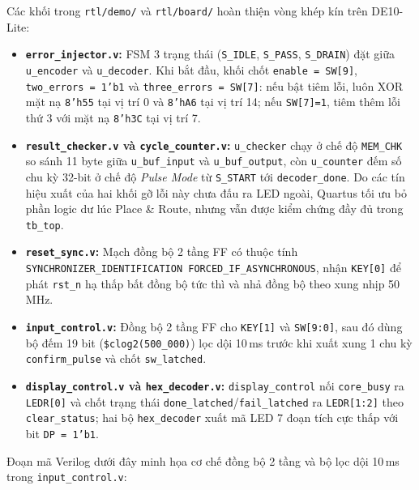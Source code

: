 Các khối trong \texttt{rtl/demo/} và \texttt{rtl/board/} hoàn thiện vòng khép kín trên DE10-Lite:
\begin{itemize}
    \item \textbf{\texttt{error\_injector.v}:} FSM 3 trạng thái (\texttt{S\_IDLE}, \texttt{S\_PASS}, \texttt{S\_DRAIN}) đặt giữa \texttt{u\_encoder} và \texttt{u\_decoder}. Khi bắt đầu, khối chốt \texttt{enable = SW[9]}, \texttt{two\_errors = 1'b1} và \texttt{three\_errors = SW[7]}: nếu bật tiêm lỗi, luôn XOR mặt nạ \texttt{8'h55} tại vị trí 0 và \texttt{8'hA6} tại vị trí 14; nếu \texttt{SW[7]=1}, tiêm thêm lỗi thứ 3 với mặt nạ \texttt{8'h3C} tại vị trí 7.
    \item \textbf{\texttt{result\_checker.v} và \texttt{cycle\_counter.v}:} \texttt{u\_checker} chạy ở chế độ \texttt{MEM\_CHK} so sánh 11 byte giữa \texttt{u\_buf\_input} và \texttt{u\_buf\_output}, còn \texttt{u\_counter} đếm số chu kỳ 32-bit ở chế độ \textit{Pulse Mode} từ \texttt{S\_START} tới \texttt{decoder\_done}. Do các tín hiệu xuất của hai khối gỡ lỗi này chưa đấu ra LED ngoài, Quartus tối ưu bỏ phần logic dư lúc Place \& Route, nhưng vẫn được kiểm chứng đầy đủ trong \texttt{tb\_top}.
    \item \textbf{\texttt{reset\_sync.v}:} Mạch đồng bộ 2 tầng FF có thuộc tính \texttt{SYNCHRONIZER\_IDENTIFICATION FORCED\_IF\_ASYNCHRONOUS}, nhận \texttt{KEY[0]} để phát \texttt{rst\_n} hạ thấp bất đồng bộ tức thì và nhả đồng bộ theo xung nhịp 50\,MHz.
    \item \textbf{\texttt{input\_control.v}:} Đồng bộ 2 tầng FF cho \texttt{KEY[1]} và \texttt{SW[9:0]}, sau đó dùng bộ đếm 19 bit (\texttt{\$clog2(500\_000)}) lọc dội 10\,ms trước khi xuất xung 1 chu kỳ \texttt{confirm\_pulse} và chốt \texttt{sw\_latched}.
    \item \textbf{\texttt{display\_control.v} và \texttt{hex\_decoder.v}:} \texttt{display\_control} nối \texttt{core\_busy} ra \texttt{LEDR[0]} và chốt trạng thái \texttt{done\_latched}/\texttt{fail\_latched} ra \texttt{LEDR[1:2]} theo \texttt{clear\_status}; hai bộ \texttt{hex\_decoder} xuất mã LED 7 đoạn tích cực thấp với bit \texttt{DP = 1'b1}.
\end{itemize}

Đoạn mã Verilog dưới đây minh họa cơ chế đồng bộ 2 tầng và bộ lọc dội 10\,ms trong \texttt{input\_control.v}:

